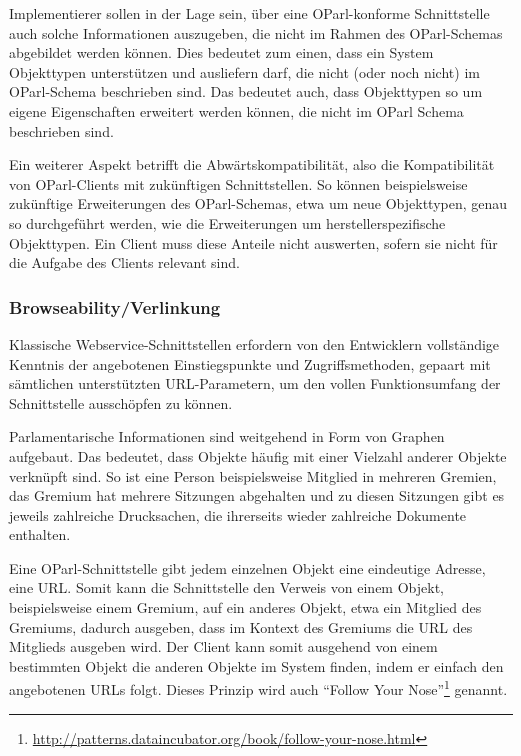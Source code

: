\documentclass[,a4paper]{article}
\begin{document}
Implementierer sollen in der Lage sein, über eine OParl-konforme
Schnittstelle auch solche Informationen auszugeben, die nicht im Rahmen
des OParl-Schemas abgebildet werden können. Dies bedeutet zum einen,
dass ein System Objekttypen unterstützen und ausliefern darf, die nicht
(oder noch nicht) im OParl-Schema beschrieben sind. Das bedeutet auch,
dass Objekttypen so um eigene Eigenschaften erweitert werden können, die
nicht im OParl Schema beschrieben sind.

Ein weiterer Aspekt betrifft die Abwärtskompatibilität, also die
Kompatibilität von OParl-Clients mit zukünftigen Schnittstellen. So
können beispielsweise zukünftige Erweiterungen des OParl-Schemas, etwa
um neue Objekttypen, genau so durchgeführt werden, wie die Erweiterungen
um herstellerspezifische Objekttypen. Ein Client muss diese Anteile
nicht auswerten, sofern sie nicht für die Aufgabe des Clients relevant
sind.

\subsubsection{Browseability/Verlinkung}\label{browseabilityux5fverlinkung}

Klassische Webservice-Schnittstellen erfordern von den Entwicklern
vollständige Kenntnis der angebotenen Einstiegspunkte und
Zugriffsmethoden, gepaart mit sämtlichen unterstützten URL-Parametern,
um den vollen Funktionsumfang der Schnittstelle ausschöpfen zu können.

Parlamentarische Informationen sind weitgehend in Form von Graphen
aufgebaut. Das bedeutet, dass Objekte häufig mit einer Vielzahl anderer
Objekte verknüpft sind. So ist eine Person beispielsweise Mitglied in
mehreren Gremien, das Gremium hat mehrere Sitzungen abgehalten und zu
diesen Sitzungen gibt es jeweils zahlreiche Drucksachen, die ihrerseits
wieder zahlreiche Dokumente enthalten.

Eine OParl-Schnittstelle gibt jedem einzelnen Objekt eine eindeutige
Adresse, eine URL. Somit kann die Schnittstelle den Verweis von einem
Objekt, beispielsweise einem Gremium, auf ein anderes Objekt, etwa ein
Mitglied des Gremiums, dadurch ausgeben, dass im Kontext des Gremiums
die URL des Mitglieds ausgeben wird. Der Client kann somit ausgehend von
einem bestimmten Objekt die anderen Objekte im System finden, indem er
einfach den angebotenen URLs folgt. Dieses Prinzip wird auch ``Follow
Your Nose''\footnote{\url{http://patterns.dataincubator.org/book/follow-your-nose.html}}
genannt.
\end{document}
